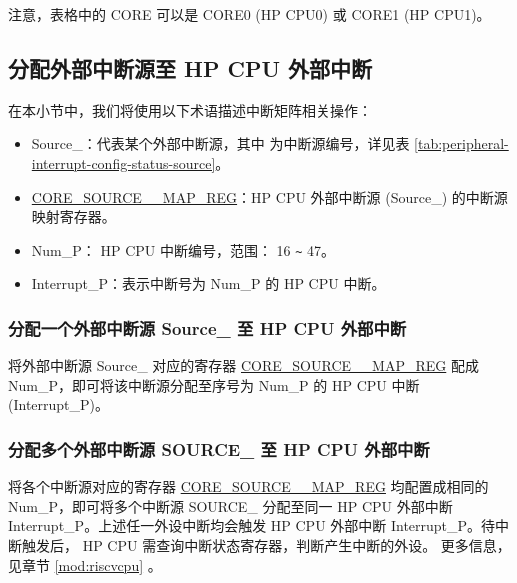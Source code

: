 \documentclass[main\_\_CN.tex]{subfiles}
\begin{document}
注意，表格中的 CORE 可以是 CORE0 (HP CPU0) 或 CORE1 (HP CPU1)。



\clearpage
\begin{landscape}

\end{landscape}
\restoregeometry
\clearpage


\subsection{分配外部中断源至 HP CPU 外部中断}

在本小节中，我们将使用以下术语描述中断矩阵相关操作：

\begin{itemize}

\item Source\_：代表某个外部中断源，其中  为中断源编号，详见表 \ref{tab:peripheral-interrupt-config-status-source}。
\item \hyperref[regdesc:CORE0SOURCEregindexYMAPREG]{CORE\_SOURCE\_\_MAP\_REG}：HP CPU 外部中断源 (Source\_) 的中断源映射寄存器。
\item Num\_P： HP CPU 中断编号，范围： 16 \verb+~+ 47。
\item Interrupt\_P：表示中断号为 Num\_P 的 HP CPU 中断。

\end{itemize}
\subsubsection{分配一个外部中断源 Source\_ 至 HP CPU 外部中断}

将外部中断源 Source\_ 对应的寄存器 \hyperref[regdesc:CORE0SOURCEregindexYMAPREG]{CORE\_SOURCE\_\_MAP\_REG} 配成 Num\_P，即可将该中断源分配至序号为 Num\_P 的 HP CPU 中断 (Interrupt\_P)。

\subsubsection{分配多个外部中断源 SOURCE\_ 至 HP CPU 外部中断}
将各个中断源对应的寄存器 \hyperref[regdesc:CORE0SOURCEregindexYMAPREG]{CORE\_SOURCE\_\_MAP\_REG} 均配置成相同的 Num\_P，即可将多个中断源 SOURCE\_ 分配至同一 HP CPU 外部中断 Interrupt\_P。上述任一外设中断均会触发 HP CPU 外部中断 Interrupt\_P。待中断触发后， HP CPU 需查询中断状态寄存器，判断产生中断的外设。 更多信息，见章节 \ref{mod:riscvcpu} \textit{}。
\end{document}
